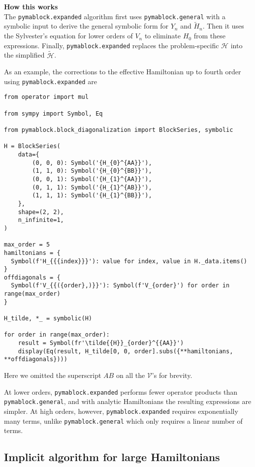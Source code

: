 \begin{framed}
\textbf{How this works}\\
The \texttt{pymablock.expanded} algorithm first uses
\texttt{pymablock.general} with a symbolic input to derive the general
symbolic form for $Y_n$ and $\tilde{H}_n$.
Then it uses the Sylvester's equation for lower orders of $V_n$ to eliminate
$H_0$ from these expressions.
Finally, \texttt{pymablock.expanded} replaces the problem-specific $\mathcal{H}$ into
the simplified $\tilde{\mathcal{H}}$.
\end{framed}

As an example, the corrections to the effective Hamiltonian up to fourth
order using \texttt{pymablock.expanded} are

\begin{verbatim}
from operator import mul

from sympy import Symbol, Eq

from pymablock.block_diagonalization import BlockSeries, symbolic

H = BlockSeries(
    data={
        (0, 0, 0): Symbol('{H_{0}^{AA}}'),
        (1, 1, 0): Symbol('{H_{0}^{BB}}'),
        (0, 0, 1): Symbol('{H_{1}^{AA}}'),
        (0, 1, 1): Symbol('{H_{1}^{AB}}'),
        (1, 1, 1): Symbol('{H_{1}^{BB}}'),
    },
    shape=(2, 2),
    n_infinite=1,
)

max_order = 5
hamiltonians = {
  Symbol(f'H_{{{index}}}'): value for index, value in H._data.items()
}
offdiagonals = {
  Symbol(f'V_{{({order},)}}'): Symbol(f'V_{order}') for order in range(max_order)
}

H_tilde, *_ = symbolic(H)

for order in range(max_order):
    result = Symbol(fr'\tilde{{H}}_{order}^{{AA}}')
    display(Eq(result, H_tilde[0, 0, order].subs({**hamiltonians, **offdiagonals})))
\end{verbatim}

Here we omitted the superscript $AB$ on all the $\mathcal{V}$'s for brevity.

At lower orders, \texttt{pymablock.expanded} performs fewer operator
products than \texttt{pymablock.general}, and with analytic Hamiltonians
the resulting expressions are simpler.
At high orders, however, \texttt{pymablock.expanded} requires exponentially
many terms, unlike \texttt{pymablock.general} which only requires a linear
number of terms.

\subsection{Implicit algorithm for large Hamiltonians}

